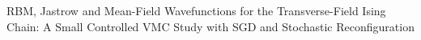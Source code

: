 RBM, Jastrow and Mean-Field Wavefunctions for the Transverse-Field Ising Chain: A Small Controlled VMC Study with SGD and Stochastic Reconfiguration
